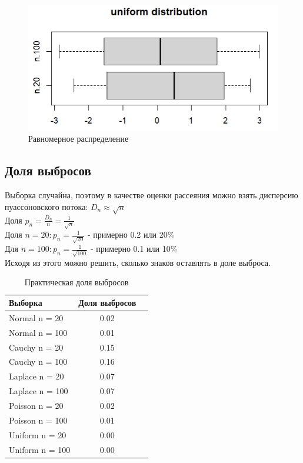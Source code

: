 \documentclass[a4paper,14pt]{article}
\begin{document}
	\begin{figure}[H]
		\centering
		\includegraphics[scale=0.9]{./lab1_3/pictures/boxplot runif.PNG}
		\caption{Равномерное распределение}
		\label{fig:uniform}
	\end{figure}
	\subsection{Доля выбросов}
	Выборка случайна, поэтому в качестве оценки рассеяния можно взять дисперсию пуассоновского потока:  $D_n \approx \sqrt{n}$\\
	Доля $p_n = \frac{D_n}{n}=\frac{1}{\sqrt{n}}$\\
	Доля $n=20: p_n=\frac{1}{\sqrt{20}}$ - примерно 0.2 или 20\% \\
	Для $n=100: p_n=\frac{1}{\sqrt{100}}$ - примерно 0.1 или 10\% \\
	Исходя из этого можно решить, сколько знаков оставлять в доле выброса.
	
	\begin{table}[H]
		\centering
		\begin{tabular}{|l|c|c|}
			\hline
			Выборка & Доля выбросов	\\\hline
			\hline
			Normal n = 20 & 0.02 \\\hline
			Normal n = 100 & 0.01 \\\hline
			Cauchy n = 20 & 0.15 \\\hline
			Cauchy n = 100 & 0.16\\\hline
			Laplace n = 20 & 0.07 \\\hline
			Laplace n = 100 & 0.07 \\\hline
			Poisson n = 20 & 0.02 \\\hline
			Poisson n = 100 & 0.01 \\\hline
			Uniform n = 20 & 0.00 \\\hline
			Uniform n = 100 & 0.00 \\\hline
		\end{tabular}
		\caption{Практическая доля выбросов}
	\end{table}
\end{document}
